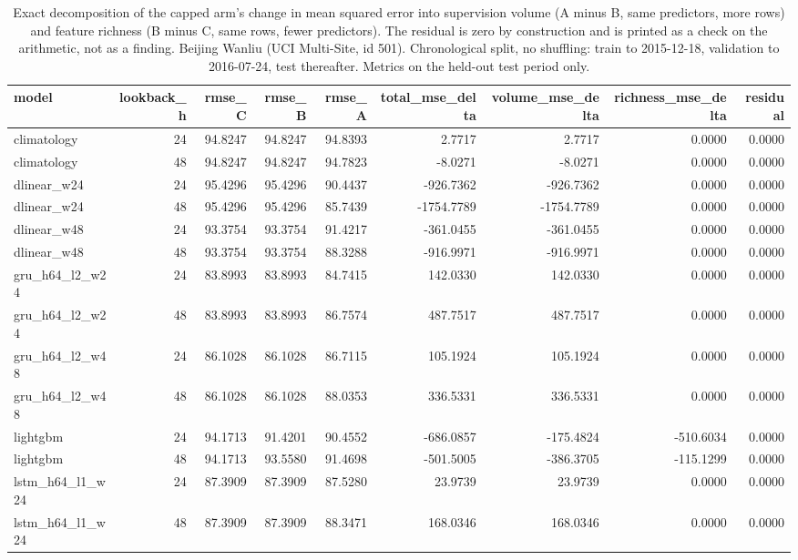 \begin{table}[htbp]
\caption{Exact decomposition of the capped arm's change in mean squared error into supervision volume (A minus B, same predictors, more rows) and feature richness (B minus C, same rows, fewer predictors). The residual is zero by construction and is printed as a check on the arithmetic, not as a finding. Beijing Wanliu (UCI Multi-Site, id 501). Chronological split, no shuffling: train to 2015-12-18, validation to 2016-07-24, test thereafter. Metrics on the held-out test period only.}
\label{tab:lookback_decomposition}
\begin{tabular}{lrrrrrrrr}
\toprule
model & lookback\_h & rmse\_C & rmse\_B & rmse\_A & total\_mse\_delta & volume\_mse\_delta & richness\_mse\_delta & residual \\
\midrule
climatology & 24 & 94.8247 & 94.8247 & 94.8393 & 2.7717 & 2.7717 & 0.0000 & 0.0000 \\
climatology & 48 & 94.8247 & 94.8247 & 94.7823 & -8.0271 & -8.0271 & 0.0000 & 0.0000 \\
dlinear\_w24 & 24 & 95.4296 & 95.4296 & 90.4437 & -926.7362 & -926.7362 & 0.0000 & 0.0000 \\
dlinear\_w24 & 48 & 95.4296 & 95.4296 & 85.7439 & -1754.7789 & -1754.7789 & 0.0000 & 0.0000 \\
dlinear\_w48 & 24 & 93.3754 & 93.3754 & 91.4217 & -361.0455 & -361.0455 & 0.0000 & 0.0000 \\
dlinear\_w48 & 48 & 93.3754 & 93.3754 & 88.3288 & -916.9971 & -916.9971 & 0.0000 & 0.0000 \\
gru\_h64\_l2\_w24 & 24 & 83.8993 & 83.8993 & 84.7415 & 142.0330 & 142.0330 & 0.0000 & 0.0000 \\
gru\_h64\_l2\_w24 & 48 & 83.8993 & 83.8993 & 86.7574 & 487.7517 & 487.7517 & 0.0000 & 0.0000 \\
gru\_h64\_l2\_w48 & 24 & 86.1028 & 86.1028 & 86.7115 & 105.1924 & 105.1924 & 0.0000 & 0.0000 \\
gru\_h64\_l2\_w48 & 48 & 86.1028 & 86.1028 & 88.0353 & 336.5331 & 336.5331 & 0.0000 & 0.0000 \\
lightgbm & 24 & 94.1713 & 91.4201 & 90.4552 & -686.0857 & -175.4824 & -510.6034 & 0.0000 \\
lightgbm & 48 & 94.1713 & 93.5580 & 91.4698 & -501.5005 & -386.3705 & -115.1299 & 0.0000 \\
lstm\_h64\_l1\_w24 & 24 & 87.3909 & 87.3909 & 87.5280 & 23.9739 & 23.9739 & 0.0000 & 0.0000 \\
lstm\_h64\_l1\_w24 & 48 & 87.3909 & 87.3909 & 88.3471 & 168.0346 & 168.0346 & 0.0000 & 0.0000 \\

\end{tabular}
\end{table}

